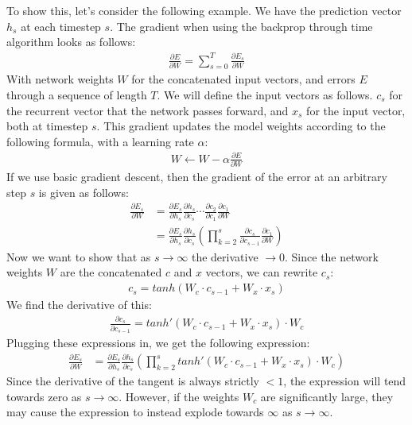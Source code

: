 To show this, let's consider the following example. We have the prediction vector $h_s$ at each timestep $s$. The gradient when using the backprop through time algorithm looks as follows:
\begin{align}
    \frac{\partial E}{\partial W} = \sum_{s=0}^{T} \frac{\partial E_s}{\partial W}
\end{align}
With network weights $W$ for the concatenated input vectors, and errors $E$ through a sequence of length $T$. We will define the input vectors as follows. $c_s$ for the recurrent vector that the network passes forward, and $x_s$ for the input vector, both at timestep $s$.
This gradient updates the model weights according to the following formula, with a learning rate $\alpha$:
\begin{align}
    W \leftarrow W - \alpha \frac{\partial E}{\partial W}
\end{align}
If we use basic gradient descent, then the gradient of the error at an arbitrary step $s$ is given as follows:
\begin{align}
    \frac{\partial E_s}{\partial W} &= \frac{\partial E_s}{\partial h_s}\frac{\partial h_s}{\partial c_s} \cdots \frac{\partial c_2}{\partial c_1} \frac{\partial c_1}{\partial W} \\
    &= \frac{\partial E_s}{\partial h_s}\frac{\partial h_s}{\partial c_s} \left(\prod_{k=2}^s\frac{\partial c_s}{\partial c_{s-1}} \frac{\partial c_1} {\partial W} \right)
\end{align}
Now we want to show that as $s \rightarrow \infty$ the derivative $\rightarrow 0$. Since the network weights $W$ are the concatenated $c$ and $x$ vectors, we can rewrite $c_s$:
\begin{align}
    c_s = tanh(W_c \cdot c_{s-1} + W_x \cdot x_s)
\end{align}
We find the derivative of this:
\begin{align}
    \frac{\partial c_s}{\partial c_{s-1}} = tanh'(W_c \cdot c_{s-1} + W_x \cdot x_s) \cdot W_c
\end{align}
Plugging these expressions in, we get the following expression:
\begin{align}
    \frac{\partial E_s}{\partial W} &= \frac{\partial E_s}{\partial h_s}\frac{\partial h_s}{\partial c_s} \left(\prod_{k=2}^s tanh'(W_c \cdot c_{s-1} + W_x \cdot x_s) \cdot W_c \right)
\end{align}
Since the derivative of the tangent is always strictly $<1$, the expression will tend towards zero as $s \rightarrow \infty$. However, if the weights $W_c$ are significantly large, they may cause the expression to instead explode towards $\infty$ as $s \rightarrow \infty$.\\
